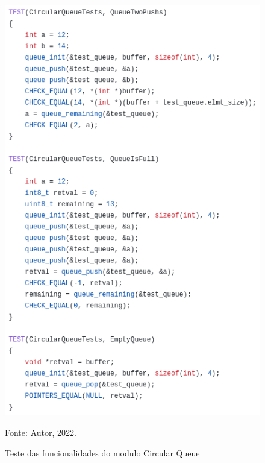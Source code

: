 \begin{figure}[H]
    \centering
	\caption{Teste das funcionalidades do modulo Circular Queue}
    \includegraphics[height=0.75\textheight,keepaspectratio]{img/test-queue.png}
    \label{fig:test-queue}
    
    Fonte: Autor, 2022.
\end{figure}

